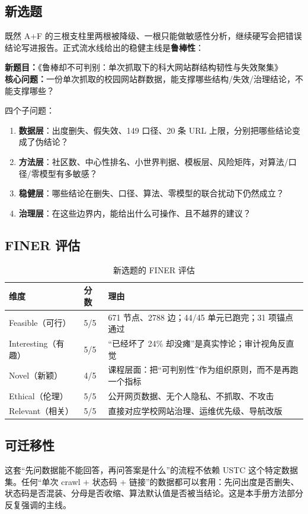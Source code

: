 \subsection{新选题}

既然 A+F 的三根支柱里两根被降级、一根只能做敏感性分析，继续硬写会把错误结论写进报告。正式流水线给出的稳健主线是\textbf{鲁棒性}：

\begin{keybox}
\textbf{新题目：}《鲁棒却不可判别：单次抓取下的科大网站群结构韧性与失效聚集》\\[2pt]
\textbf{核心问题：}一份单次抓取的校园网站群数据，能支撑哪些结构/失效/治理结论，不能支撑哪些？
\end{keybox}

四个子问题：

\begin{enumerate}
  \item \textbf{数据层}：出度删失、假失效、149 口径、20 条 URL 上限，分别把哪些结论变成了伪结论？
  \item \textbf{方法层}：社区数、中心性排名、小世界判据、模板层、风险矩阵，对算法/口径/零模型有多敏感？
  \item \textbf{稳健层}：哪些结论在删失、口径、算法、零模型的联合扰动下仍然成立？
  \item \textbf{治理层}：在这些边界内，能给出什么可操作、且不越界的建议？
\end{enumerate}

\subsection{FINER 评估}

\begin{table}[H]
\centering
\caption{新选题的 FINER 评估}
\begin{tabularx}{\textwidth}{@{}p{}p{}X@{}}
\toprule
维度 & 分数 & 理由 \\
\midrule
Feasible（可行） & 5/5 & 671 节点、2788 边；44/45 单元已跑完；31 项锚点通过 \\
Interesting（有趣） & 5/5 & “已经坏了 24\% 却没瘫”是真实悖论；审计视角反直觉 \\
Novel（新颖） & 4/5 & 课程层面：把“可判别性”作为组织原则，而不是再跑一个指标 \\
Ethical（伦理） & 5/5 & 公开网页数据、无个人隐私、不抓取、不攻击 \\
Relevant（相关） & 5/5 & 直接对应学校网站治理、运维优先级、导航改版 \\
\bottomrule
\end{tabularx}
\end{table}

\subsection{可迁移性}

这套“先问数据能不能回答，再问答案是什么”的流程不依赖 USTC 这个特定数据集。任何“单次 crawl + 状态码 + 链接”的数据都可以套用：先问出度是否删失、状态码是否混装、分母是否收缩、算法默认值是否被当结论。这是本手册方法部分反复强调的主线。
